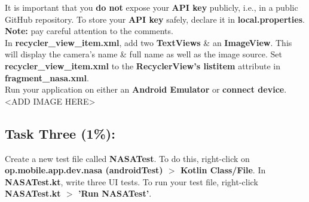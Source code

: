 \documentclass{article}
\begin{document}
It is important that you \textbf{do not} expose your \textbf{API key} publicly, i.e., in a public GitHub repository. To store your \textbf{API key} safely, declare it in \textbf{local.properties}. \textbf{Note:} pay careful attention to the comments. \\

In \textbf{recycler\_view\_item.xml}, add two \textbf{TextViews} \& an \textbf{ImageView}. This will display the camera's name \& full name as well as the image source. Set \textbf{recycler\_view\_item.xml} to the \textbf{RecyclerView's listitem} attribute in \textbf{fragment\_nasa.xml}. \\

Run your application on either an \textbf{Android Emulator} or \textbf{connect device}. \\ 

<ADD IMAGE HERE>

\subsection*{Task Three (1\%):}
Create a new test file called \textbf{NASATest}. To do this, right-click on \textbf{op.mobile.app.dev.nasa (androidTest) $>$ Kotlin Class/File}. In \textbf{NASATest.kt}, write three UI tests. To run your test file, right-click \textbf{NASATest.kt $>$ 'Run NASATest'}.
\end{document}
